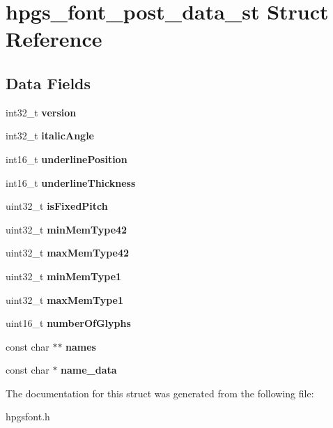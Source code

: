 \section{hpgs\_\-font\_\-post\_\-data\_\-st Struct Reference}
\label{structhpgs__font__post__data__st}
\subsection*{Data Fields}
\begin{DoxyCompactItemize}
\item 
int32\_\-t {\bfseries version}\label{structhpgs__font__post__data__st_abd81f83682edcd7077981b5541c5f3e7}

\item 
int32\_\-t {\bfseries italicAngle}\label{structhpgs__font__post__data__st_a04cefca4c0e0821070240dc630f83978}

\item 
int16\_\-t {\bfseries underlinePosition}\label{structhpgs__font__post__data__st_a91f009130d218119ff37d6970c0408f1}

\item 
int16\_\-t {\bfseries underlineThickness}\label{structhpgs__font__post__data__st_a7d98408799282851b139b65eed0cc637}

\item 
uint32\_\-t {\bfseries isFixedPitch}\label{structhpgs__font__post__data__st_ac520055f7284316bfb61673820b8ac4c}

\item 
uint32\_\-t {\bfseries minMemType42}\label{structhpgs__font__post__data__st_ab038d4c8944da0863f21dd956249a378}

\item 
uint32\_\-t {\bfseries maxMemType42}\label{structhpgs__font__post__data__st_a75df2252c2ce8284c7225d66bc96cb6c}

\item 
uint32\_\-t {\bfseries minMemType1}\label{structhpgs__font__post__data__st_a96610de7da0a9003c65f13fb3036fecb}

\item 
uint32\_\-t {\bfseries maxMemType1}\label{structhpgs__font__post__data__st_aacaf105c1631a813d3ce7884d9812e8a}

\item 
uint16\_\-t {\bfseries numberOfGlyphs}\label{structhpgs__font__post__data__st_ad80c8bfbaa2d2c7a513f645d1406ff59}

\item 
const char $\ast$$\ast$ {\bfseries names}\label{structhpgs__font__post__data__st_a35ad1db382c8443d1c0117f41125b0bd}

\item 
const char $\ast$ {\bfseries name\_\-data}\label{structhpgs__font__post__data__st_a54eb2dd9b9ec01ca8a450eb0de65fd25}

\end{DoxyCompactItemize}


The documentation for this struct was generated from the following file:\begin{DoxyCompactItemize}
\item 
hpgsfont.h\end{DoxyCompactItemize}
